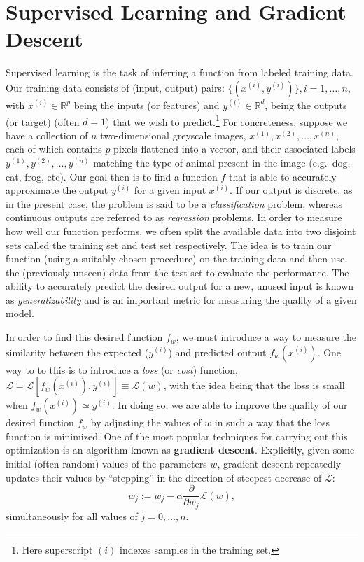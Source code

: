 \documentclass[../main.tex]{subfiles}
\begin{document}
\section{Supervised Learning and Gradient Descent}%
\label{sec:supervised_learning_gradient_descent} Supervised learning is the
task of inferring a function from labeled training data.
%
Our training data consists of (input, output) pairs: $\{(x^{(i)}, y^{(i)})\}, i
= 1, \ldots, n$, with $x^{(i)} \in \mathbb{R}^{p}$ being the inputs (or
features) and $y^{(i)} \in \mathbb{R}^{d}$, being the outputs (or target)
(often $d = 1$) that we wish to predict.\footnote{Here superscript $(i)$
indexes samples in the training set.}
%
For concreteness, suppose we have a collection of $n$ two-dimensional greyscale
images, $x^{(1)}, x^{(2)}, \ldots, x^{(n)}$, each of which contains $p$ pixels
flattened into a vector, and their associated labels $y^{(1)}, y^{(2)}, \ldots,
y^{(n)}$ matching the type of animal present in the image (e.g.\ dog, cat,
frog, etc).
%
Our goal then is to find a function $f$ that is able to accurately approximate
the output $y^{(i)}$ for a given input $x^{(i)}$.
%
If our output is discrete, as in the present case, the problem is said to be a
\emph{classification} problem, whereas continuous outputs are referred to as
\emph{regression} problems.
%
In order to measure how well our function performs, we often split the
available data into two disjoint sets called the training set and test set
respectively.
%
The idea is to train our function (using a suitably chosen procedure) on the
training data and then use the (previously unseen) data from the test set to
evaluate the performance.
%
The ability to accurately predict the desired output for a new, unused input is
known as \emph{generalizability} and is an important metric for measuring the
quality of a given model.

In order to find this desired function $f_w$, we must introduce a way to
measure the similarity between the expected ($y^{(i)}$) and predicted output
$f_{w}(x^{(i)})$.
%
One way to to this is to introduce a \emph{loss} (or \emph{cost}) function,
$\mathcal{L} = \mathcal{L}[f_{w}(x^{(i)}), y^{(i)}] \equiv \mathcal{L}(w)$,
with the idea being that the loss is small when $f_{w}(x^{(i)}) \simeq
y^{(i)}$.
%
In doing so, we are able to improve the quality of our desired function $f_w$
by adjusting the values of $w$ in such a way that the loss function is
minimized.
%
One of the most popular techniques for carrying out this optimization is an
algorithm known as \textbf{gradient descent}.
%
Explicitly, given some initial (often random) values of the parameters $w$,
gradient descent repeatedly updates their values by ``stepping'' in the
direction of steepest decrease of $\mathcal{L}$:
%
\begin{equation}
  w_{j} := w_{j} - \alpha \frac{\partial}{\partial w_{j}} \mathcal{L}(w), %
\end{equation}
%
simultaneously for all values of $j = 0, \ldots, n$.
\end{document}
